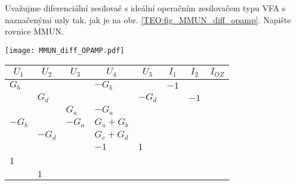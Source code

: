 \begin{example}\label{TEO:ex_DifOpamp01} 
  Uvažujme diferenciální zesilovač s ideální operačním zesilovačem typu VFA s naznačenými 
  uzly tak, jak je na obr. \ref{TEO:fig_MMUN_diff_opamp}. Napište rovnice MMUN.

   {\centering
    \captionsetup{type=figure}
    \texttt{[image: MMUN\_diff\_OPAMP.pdf]}
    \label{TEO:fig_MMUN_diff_opamp}
    \par}
    {\centering
    \begin{tabular}{|C{0.6cm}|C{0.6cm}|C{0.6cm}|C{1.2cm}|C{0.6cm}|C{0.45cm}|C{0.45cm}|C{0.45cm}|}
          &    &   & 
          &    &   & 
          &                       \\
        \hline
        $G_b$  &        &        & $-G_b$    &         & \(-1\) &        &             \\
        \hline
               & $G_d$  &        &           & $-G_d$  &        & \(-1\) &             \\
        \hline
               &        &  $G_a$ & $-G_a$    &         &        &        &             \\
        \hline 
        $-G_b$ &        & $-G_a$ & $G_a+G_b$ &         &        &        &             \\
        \hline
               & $-G_d$ &        & $G_c+G_d$ &         &        &        &             \\
        \hline
               &        &        &  \(-1\)   &  \(1\)  &        &        &             \\
             &        &        &           &         &        &        &             \\
        \hline   
               & \(1\)  &        &           &         &        &        &             \\
        \hline    
    \end{tabular}
    \par}
\end{example}
